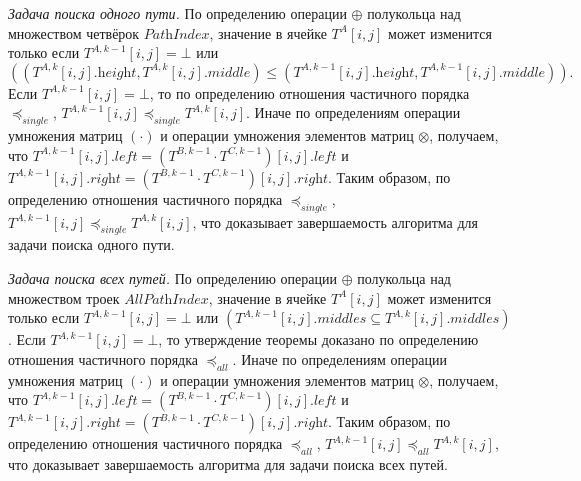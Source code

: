 \textit{Задача поиска одного пути.} По определению операции $\oplus$ полукольца над множеством четвёрок $\textit{PathIndex}$, значение в ячейке $T^A[i, j]$ может изменится только если $T^{A, k - 1}[i, j] = \bot$ или $$((T^{A, k}[i, j].\textit{height}, T^{A, k}[i, j].\textit{middle}) \leq (T^{A, k - 1}[i, j].\textit{height}, T^{A, k - 1}[i, j].\textit{middle})).$$ Если $T^{A, k - 1}[i, j] = \bot$, то по определению отношения частичного порядка $\preceq_{\textit{single}}$, $T^{A, k - 1}[i, j] \preceq_{\textit{single}} T^{A, k}[i, j]$. Иначе по определениям операции умножения матриц $(\cdot)$ и операции умножения элементов матриц $\otimes$, получаем, что $T^{A, k - 1}[i, j].\textit{left} = (T^{B, k - 1} \cdot T^{C, k - 1})[i, j].\textit{left}$ и $T^{A, k - 1}[i, j].\textit{right} = (T^{B, k - 1} \cdot T^{C, k - 1})[i, j].\textit{right}$. Таким образом, по определению отношения частичного порядка $\preceq_{\textit{single}}$, $T^{A, k - 1}[i, j] \preceq_{\textit{single}} T^{A, k}[i, j]$, что доказывает завершаемость алгоритма для задачи поиска одного пути.

\textit{Задача поиска всех путей.} По определению операции $\oplus$ полукольца над множеством троек $\textit{AllPathIndex}$, значение в ячейке $T^A[i, j]$ может изменится только если $T^{A, k - 1}[i, j] = \bot$ или $(T^{A, k - 1}[i, j].\textit{middles} \subseteq T^{A, k}[i, j].\textit{middles})$. Если $T^{A, k - 1}[i, j] = \bot$, то утверждение теоремы доказано по определению отношения частичного порядка $\preceq_{\textit{all}}$. Иначе по определениям операции умножения матриц $(\cdot)$ и операции умножения элементов матриц $\otimes$, получаем, что $T^{A, k - 1}[i, j].\textit{left} = (T^{B, k - 1} \cdot T^{C, k - 1})[i, j].\textit{left}$ и $T^{A, k - 1}[i, j].\textit{right} = (T^{B, k - 1} \cdot T^{C, k - 1})[i, j].\textit{right}$. Таким образом, по определению отношения частичного порядка $\preceq_{\textit{all}}$, $T^{A, k - 1}[i, j] \preceq_{\textit{all}} T^{A, k}[i, j]$, что доказывает завершаемость алгоритма для задачи поиска всех путей.

